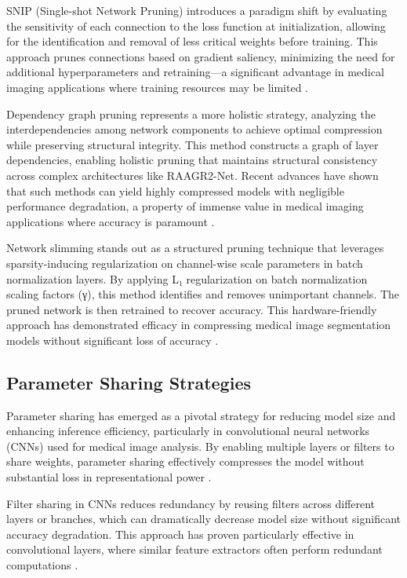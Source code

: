 \documentclass[12pt,a4paper]{article}
\begin{document}
SNIP (Single-shot Network Pruning) introduces a paradigm shift by evaluating the sensitivity of each connection to the loss function at initialization, allowing for the identification and removal of less critical weights before training. This approach prunes connections based on gradient saliency, minimizing the need for additional hyperparameters and retraining—a significant advantage in medical imaging applications where training resources may be limited \cite{Lee2019SNIP, Liu2023Survey}.

Dependency graph pruning represents a more holistic strategy, analyzing the interdependencies among network components to achieve optimal compression while preserving structural integrity. This method constructs a graph of layer dependencies, enabling holistic pruning that maintains structural consistency across complex architectures like RAAGR2-Net. Recent advances have shown that such methods can yield highly compressed models with negligible performance degradation, a property of immense value in medical imaging applications where accuracy is paramount \cite{Mazurek2024, Ragab2024}.

Network slimming stands out as a structured pruning technique that leverages sparsity-inducing regularization on channel-wise scale parameters in batch normalization layers. By applying L₁ regularization on batch normalization scaling factors (γ), this method identifies and removes unimportant channels. The pruned network is then retrained to recover accuracy. This hardware-friendly approach has demonstrated efficacy in compressing medical image segmentation models without significant loss of accuracy \cite{Liu2023Survey, Mazurek2024}.

\subsection{Parameter Sharing Strategies}

Parameter sharing has emerged as a pivotal strategy for reducing model size and enhancing inference efficiency, particularly in convolutional neural networks (CNNs) used for medical image analysis. By enabling multiple layers or filters to share weights, parameter sharing effectively compresses the model without substantial loss in representational power \cite{Wang2023Review, Jeong2021}.

Filter sharing in CNNs reduces redundancy by reusing filters across different layers or branches, which can dramatically decrease model size without significant accuracy degradation. This approach has proven particularly effective in convolutional layers, where similar feature extractors often perform redundant computations \cite{Jeong2021, Wang2023Review}.
\end{document}
